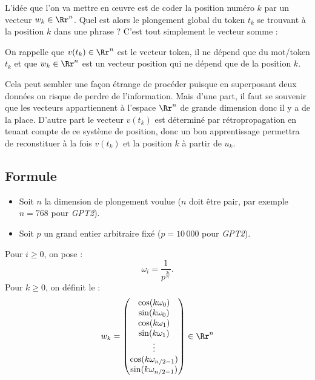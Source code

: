\documentclass[11pt,class=report,crop=false]{standalone}
\begin{document}
L'idée que l'on va mettre en œuvre est de coder la position numéro $k$ par un vecteur $w_k \in \Rr^n$.
Quel est alors le plongement global du token $t_k$ se trouvant à la position $k$ dans une phrase ?
C'est tout simplement le vecteur somme :

On rappelle que $v(t_k) \in \Rr^n$ est le vecteur token, il ne dépend que du mot/token $t_k$ et que $w_k \in \Rr^n$ est un vecteur position qui ne dépend que de la position $k$.

Cela peut sembler une façon étrange de procéder puisque en superposant deux données on risque de perdre de l'information.
Mais d'une part, il faut se souvenir que les vecteurs appartiennent à l'espace $\Rr^n$ de grande dimension donc il y a de la place.
D'autre part le vecteur $v(t_k)$ est déterminé par rétropropagation en tenant compte de ce système de position, donc un bon apprentissage permettra de reconstituer à la fois $v(t_k)$ et la position $k$ à partir de $u_k$.


\subsection{Formule}

\begin{itemize}
	\item Soit $n$ la dimension de plongement voulue ($n$ doit être pair, par exemple $n=768$ pour \emph{GPT2}).
	
	\item Soit $p$ un grand entier arbitraire fixé ($p=10\,000$ pour \emph{GPT2}). 
\end{itemize}

Pour $i \ge 0$, on pose :
$$\omega_i = \frac{1}{p^\frac{2i}{n}}.$$
Pour $k \ge 0$, on définit le  :
\[ w_k = 
\begin{pmatrix}
  \cos(	k \omega_0 ) \\
  \sin(	k \omega_0 ) \\
  \cos(	k \omega_1 ) \\
  \sin(	k \omega_1 ) \\
	\vdots \\
  \cos(	k \omega_{n/2-1} ) \\
  \sin(	k \omega_{n/2-1} ) \\	  
\end{pmatrix}
\in \Rr^n
\]
\end{document}
